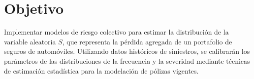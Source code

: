 \section*{Objetivo}

Implementar modelos de riesgo colectivo para estimar la distribución de la variable aleatoria $S$, que representa la pérdida agregada de un portafolio de seguros de automóviles. Utilizando datos históricos de siniestros, se calibrarán los parámetros de las distribuciones de la frecuencia y la severidad mediante técnicas de estimación estadística para la modelación de pólizas vigentes.
